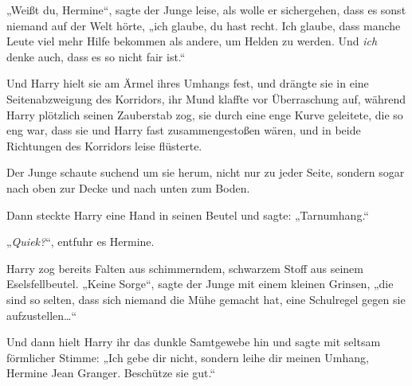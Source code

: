 „Weißt du, Hermine“, sagte der Junge leise, als wolle er sichergehen, dass es sonst niemand auf der Welt hörte, „ich glaube, du hast recht. Ich glaube, dass manche Leute viel mehr Hilfe bekommen als andere, um Helden zu werden. Und \emph{ich} denke auch, dass es so nicht fair ist.“

Und Harry hielt sie am Ärmel ihres Umhangs fest, und drängte sie in eine Seitenabzweigung des Korridors, ihr Mund klaffte vor Überraschung auf, während Harry plötzlich seinen Zauberstab zog, sie durch eine enge Kurve geleitete, die so eng war, dass sie und Harry fast zusammengestoßen wären, und in beide Richtungen des Korridors leise  flüsterte.

Der Junge schaute suchend um sie herum, nicht nur zu jeder Seite, sondern sogar nach oben zur Decke und nach unten zum Boden.

Dann steckte Harry eine Hand in seinen Beutel und sagte: „Tarnumhang.“

„\emph{Quiek?}“, entfuhr es Hermine.

Harry zog bereits Falten aus schimmerndem, schwarzem Stoff aus seinem Eselsfellbeutel. „Keine Sorge“, sagte der Junge mit einem kleinen Grinsen, „die sind so selten, dass sich niemand die Mühe gemacht hat, eine Schulregel gegen sie aufzustellen…“

Und dann hielt Harry ihr das dunkle Samtgewebe hin und sagte mit seltsam förmlicher Stimme: „Ich gebe dir nicht, sondern leihe dir meinen Umhang, Hermine Jean Granger. Beschütze sie gut.“


